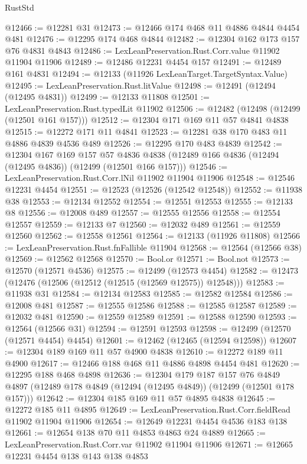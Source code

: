 \begin{lexlean}{RustStd}
\begin{coremodule}
@12466 := @12281 @31
@12473 := @12466 @174 @468 @11 @4886 @4844 @4454 @481
@12476 := @12295 @174 @468 @4844
@12482 := @12304 @162 @173 @157 @76 @4831 @4843
@12486 := LexLeanPreservation.Rust.Corr.value @11902 @11904 @11906
@12489 := @12486 @12231 @4454 @157
@12491 := @12489 @161 @4831
@12494 := @12133 (@11926 LexLeanTarget.TargetSyntax.Value)
@12495 := LexLeanPreservation.Rust.litValue
@12498 := @12491 (@12494 (@12495 @4831))
@12499 := @12133 @11808
@12501 := LexLeanPreservation.Rust.typedLit @11902
@12506 := @12482 (@12498 (@12499 (@12501 @161 @157)))
@12512 := @12304 @171 @169 @11 @57 @4841 @4838
@12515 := @12272 @171 @11 @4841
@12523 := @12281 @38 @170 @483 @11 @4886 @4839 @4536 @489
@12526 := @12295 @170 @483 @4839
@12542 := @12304
    @167
    @169
    @157
    @57
    @4836
    @4838
    (@12489 @166 @4836 (@12494 (@12495 @4836)) (@12499 (@12501 @166 @157)))
@12546 := LexLeanPreservation.Rust.Corr.lNil @11902 @11904 @11906
@12548 := @12546 @12231 @4454
@12551 := @12523 (@12526 (@12542 @12548))
@12552 := @11938 @38
@12553 := @12134 @12552
@12554 := @12551 @12553
@12555 := @12133 @8
@12556 := @12008 @489
@12557 := @12555 @12556
@12558 := @12554 @12557
@12559 := @12133 @7
@12560 := @12032 @489
@12561 := @12559 @12560
@12562 := @12558 @12561
@12564 := @12133 (@11926 @11808)
@12566 := LexLeanPreservation.Rust.fnFallible @11904
@12568 := @12564 (@12566 @38)
@12569 := @12562 @12568
@12570 := Bool.or
@12571 := Bool.not
@12573 := @12570 (@12571 @4536)
@12575 := @12499 (@12573 @4454)
@12582 := @12473 (@12476 (@12506 (@12512 (@12515 (@12569 @12575)) @12548)))
@12583 := @11938 @31
@12584 := @12134 @12583
@12585 := @12582 @12584
@12586 := @12008 @481
@12587 := @12555 @12586
@12588 := @12585 @12587
@12589 := @12032 @481
@12590 := @12559 @12589
@12591 := @12588 @12590
@12593 := @12564 (@12566 @31)
@12594 := @12591 @12593
@12598 := @12499 (@12570 (@12571 @4454) @4454)
@12601 := @12462 (@12465 (@12594 @12598))
@12607 := @12304 @189 @169 @11 @57 @4900 @4838
@12610 := @12272 @189 @11 @4900
@12617 := @12466 @188 @468 @11 @4886 @4898 @4454 @481
@12620 := @12295 @188 @468 @4898
@12636 := @12304
    @179
    @187
    @157
    @76
    @4849
    @4897
    (@12489 @178 @4849 (@12494 (@12495 @4849)) (@12499 (@12501 @178 @157)))
@12642 := @12304 @185 @169 @11 @57 @4895 @4838
@12645 := @12272 @185 @11 @4895
@12649 := LexLeanPreservation.Rust.Corr.fieldRead @11902 @11904 @11906
@12654 := @12649 @12231 @4454 @4536 @183 @138
@12661 := @12654 @138 @70 @11 @4853 @4863 @24 @4889
@12665 := LexLeanPreservation.Rust.Corr.var @11902 @11904 @11906
@12671 := @12665 @12231 @4454 @138 @143 @138 @4853

\end{coremodule}
\end{lexlean}
